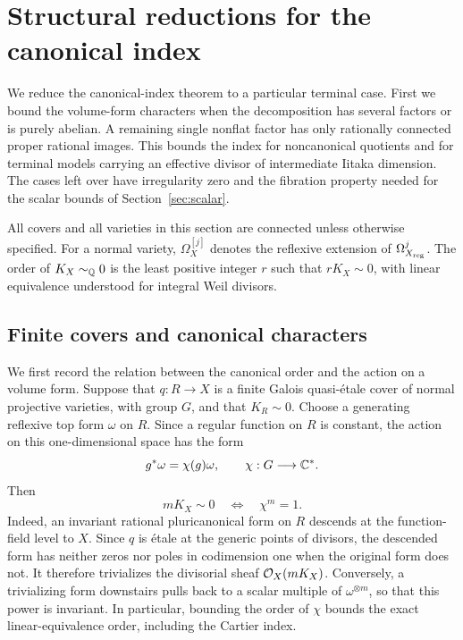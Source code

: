 \section{Structural reductions for the canonical index}\label{sec:index-reductions}

We reduce the canonical-index theorem to a particular terminal case.
First we bound the volume-form characters when the decomposition has
several factors or is purely abelian. A remaining single nonflat factor
has only rationally connected proper rational images. This bounds the
index for noncanonical quotients and for terminal models carrying an
effective divisor of intermediate Iitaka dimension. The cases left over
have irregularity zero and the fibration property needed for the scalar
bounds of Section~\ref{sec:scalar}.

All covers and all varieties in this
section are connected unless otherwise specified.  For a normal variety,
\(\Omega_X^{[j]}\) denotes the reflexive extension of \(\Omega^j_{X_{\rm reg}}\).
The order of \(K_X\sim_{\mathbb Q}0\) is the least positive integer \(r\) such that
\(rK_X\sim0\), with linear equivalence understood for integral Weil divisors.

\subsection{Finite covers and canonical characters}

We first record the relation between the canonical order and the action on a
volume form.  Suppose that \(q:R\to X\) is a finite Galois quasi-\'etale cover
of normal projective varieties, with group \(G\), and that \(K_R\sim0\).
Choose a generating reflexive top form \(\omega\) on \(R\).  Since a regular
function on \(R\) is constant, the action on this one-dimensional space has
the form
\[
                   g^*\omega=\chi(g)\omega,
             \qquad \chi:G\longrightarrow\mathbb C^*.
\]
Then
\begin{equation}\label{eq:index-character}
          mK_X\sim0\quad\Longleftrightarrow\quad\chi^m=1.
\end{equation}
Indeed, an invariant rational pluricanonical form on \(R\) descends at the
function-field level to \(X\).  Since \(q\) is \'etale at the generic points
of divisors, the descended form has neither zeros nor poles in codimension
one when the original form does not.  It therefore trivializes the
divisorial sheaf \(\mathcal O_X(mK_X)\).  Conversely, a trivializing form downstairs
pulls back to a scalar multiple of \(\omega^{\otimes m}\), so that this
power is invariant.  In particular, bounding the order of \(\chi\) bounds
the exact linear-equivalence order, including the Cartier index.

